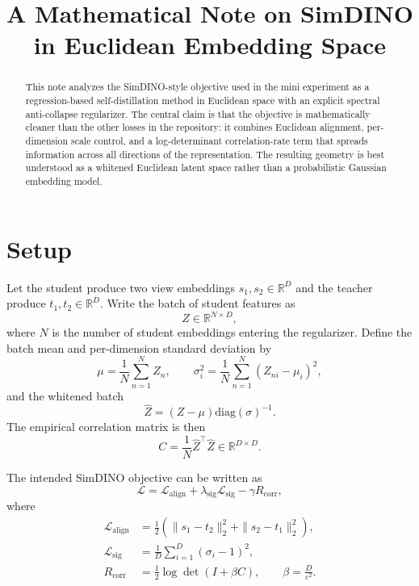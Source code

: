 \documentclass[11pt]{article}
\title{A Mathematical Note on SimDINO in Euclidean Embedding Space}
\author{}
\date{}
\newcommand{\R}{\mathbb{R}}
\newcommand{\diag}{\mathrm{diag}}
\begin{document}
\maketitle

\begin{abstract}
This note analyzes the SimDINO-style objective used in the mini experiment as a regression-based self-distillation method in Euclidean space with an explicit spectral anti-collapse regularizer. The central claim is that the objective is mathematically cleaner than the other losses in the repository: it combines Euclidean alignment, per-dimension scale control, and a log-determinant correlation-rate term that spreads information across all directions of the representation. The resulting geometry is best understood as a whitened Euclidean latent space rather than a probabilistic Gaussian embedding model.
\end{abstract}

\section{Setup}

Let the student produce two view embeddings $s_1, s_2 \in \R^D$ and the teacher produce $t_1, t_2 \in \R^D$. Write the batch of student features as
\begin{equation}
    Z \in \R^{N \times D},
\end{equation}
where $N$ is the number of student embeddings entering the regularizer. Define the batch mean and per-dimension standard deviation by
\begin{equation}
    \mu = \frac{1}{N} \sum_{n=1}^{N} Z_n,
    \qquad
    \sigma_i^2 = \frac{1}{N} \sum_{n=1}^{N} (Z_{ni} - \mu_i)^2,
\end{equation}
and the whitened batch
\begin{equation}
    \widehat{Z} = (Z - \mu)\diag(\sigma)^{-1}.
\end{equation}
The empirical correlation matrix is then
\begin{equation}
    C = \frac{1}{N}\widehat{Z}^{\top}\widehat{Z} \in \R^{D \times D}.
\end{equation}

The intended SimDINO objective can be written as
\begin{equation}
    \mathcal{L}
    =
    \mathcal{L}_{\mathrm{align}}
    +
    \lambda_{\mathrm{sig}} \mathcal{L}_{\mathrm{sig}}
    -
    \gamma R_{\mathrm{corr}},
\end{equation}
where
\begin{align}
    \mathcal{L}_{\mathrm{align}}
    &=
    \frac{1}{2}
    \left(
    \|s_1 - t_2\|_2^2 + \|s_2 - t_1\|_2^2
    \right), \\
    \mathcal{L}_{\mathrm{sig}}
    &=
    \frac{1}{D}
    \sum_{i=1}^{D} (\sigma_i - 1)^2, \\
    R_{\mathrm{corr}}
    &=
    \frac{1}{2}
    \log \det(I + \beta C),
    \qquad
    \beta = \frac{D}{\varepsilon^2}.
\end{align}
\end{document}
